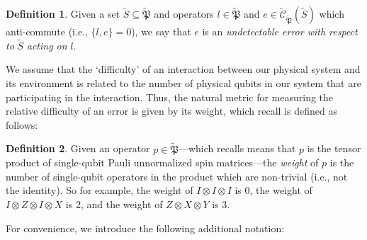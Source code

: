 \documentclass{amsbook}
\theoremstyle{plain}
\theoremstyle{definition}
\newtheorem{definition}{Definition}
\theoremstyle{remark}
\newcommand{\set}{\tilde}
\newcommand{\pauligroup}{{\set{\mathfrak{P}}}}
\newcommand{\centralizer}{\set{\mathcal{C}}}
\begin{document}
\begin{definition}
Given a set $\set S\subseteq\pauligroup$ and operators $l\in\pauligroup$ and $e\in\centralizer_\pauligroup(\set S)$ which anti-commute (i.e., $\{l,e\}=0$), we say that $e$ is an \emph{undetectable error with respect to} $\set S$ \emph{acting on} $l$.
\end{definition}
We assume that the `difficulty' of an interaction between our physical system and its environment is related to the number of physical qubits in our system that are participating in the interaction.  Thus, the natural metric for measuring the relative difficulty of an error is given by its weight, which recall is defined as follows:

\begin{definition}
Given an operator $p\in\pauligroup$---which recalls means that $p$ is the tensor product of single-qubit Pauli unnormalized spin matrices---the \emph{weight} of $p$ is the number of single-qubit operators in the product which are non-trivial (i.e., not the identity).  So for example, the weight of $I\otimes I\otimes I$ is 0, the weight of $I\otimes Z\otimes I\otimes X$ is 2, and the weight of $Z\otimes X\otimes Y$ is 3.
\end{definition}
For convenience, we introduce the following additional notation:
\end{document}
